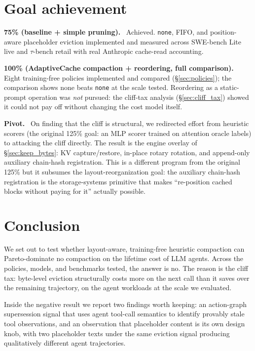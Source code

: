 \documentclass[letterpaper,twocolumn,10pt]{article}
\newcommand{\sysname}{AdaptiveCache}
\newcommand{\para}[1]{\smallskip\noindent\textbf{#1.}\ }
\begin{document}
\section{Goal achievement}
\label{sec:goals}

\para{75\% (baseline + simple pruning)} Achieved. \texttt{none},
FIFO, and position-aware placeholder eviction implemented and
measured across SWE-bench Lite live and $\tau$-bench retail with
real Anthropic cache-read accounting.

\para{100\% (\sysname{} compaction + reordering, full comparison)}
Eight training-free policies implemented and compared
(\S\ref{sec:policies}); the comparison shows none beats
\texttt{none} at the scale tested. Reordering as a static-prompt
operation was \emph{not} pursued: the cliff-tax analysis
(\S\ref{sec:cliff_tax}) showed it could not pay off without
changing the cost model itself.

\para{Pivot} On finding that the cliff is structural, we redirected
effort from heuristic scorers (the original 125\% goal: an MLP
scorer trained on attention oracle labels) to attacking the cliff
directly. The result is the engine overlay of
\S\ref{sec:keep_bytes}: KV capture/restore, in-place rotary
rotation, and append-only auxiliary chain-hash registration. This
is a different program from the original 125\% but it subsumes the
layout-reorganization goal: the auxiliary chain-hash registration
is the storage-systems primitive that makes ``re-position cached
blocks without paying for it'' actually possible.

\section{Conclusion}
\label{sec:conclusion}

We set out to test whether layout-aware, training-free heuristic
compaction can Pareto-dominate no compaction on the lifetime cost
of LLM agents. Across the policies, models, and benchmarks
tested, the answer is no. The reason is the cliff tax:
byte-level eviction structurally costs more on the next call
than it saves over the remaining trajectory, on the agent
workloads at the scale we evaluated.

Inside the negative result we report two findings worth keeping:
an action-graph supersession signal that uses agent tool-call
semantics to identify provably stale tool observations, and an
observation that placeholder content is its own design knob, with
two placeholder texts under the same eviction signal producing
qualitatively different agent trajectories.
\end{document}
